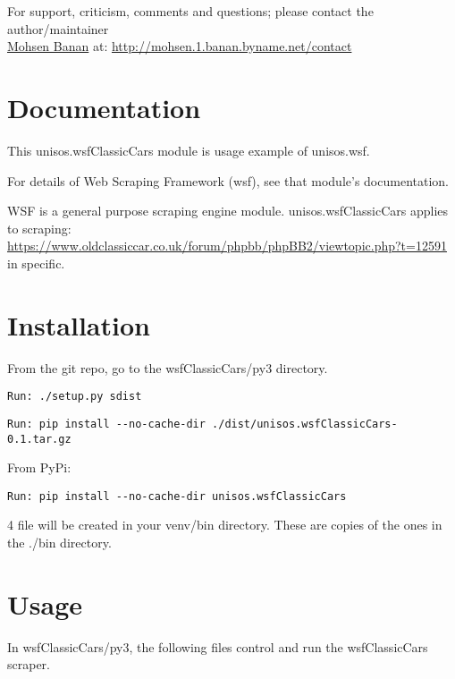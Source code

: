 \documentclass{article}
\begin{document}
For support, criticism, comments and questions; please contact the 
author/maintainer \\
\href{http://mohsen.1.banan.byname.net}{Mohsen Banan} at: \url{http://mohsen.1.banan.byname.net/contact}


\section{Documentation}

This unisos.wsfClassicCars module is usage example of unisos.wsf.

For details of Web Scraping Framework (wsf), see that module's documentation.

WSF is a general purpose scraping engine module.
unisos.wsfClassicCars applies to scraping:\\
\url{https://www.oldclassiccar.co.uk/forum/phpbb/phpBB2/viewtopic.php?t=12591}
in specific.

\section{Installation}

From the git repo, go to the wsfClassicCars/py3 directory.

\begin{verbatim}
Run: ./setup.py sdist
\end{verbatim}

\begin{verbatim}
Run: pip install --no-cache-dir ./dist/unisos.wsfClassicCars-0.1.tar.gz
\end{verbatim}

From PyPi:

\begin{verbatim}
Run: pip install --no-cache-dir unisos.wsfClassicCars
\end{verbatim}


4 file will be created in your venv/bin directory.
These are copies of the ones in the ./bin directory.

\section{Usage}

In wsfClassicCars/py3,
the following files control and run the wsfClassicCars scraper.
\end{document}

